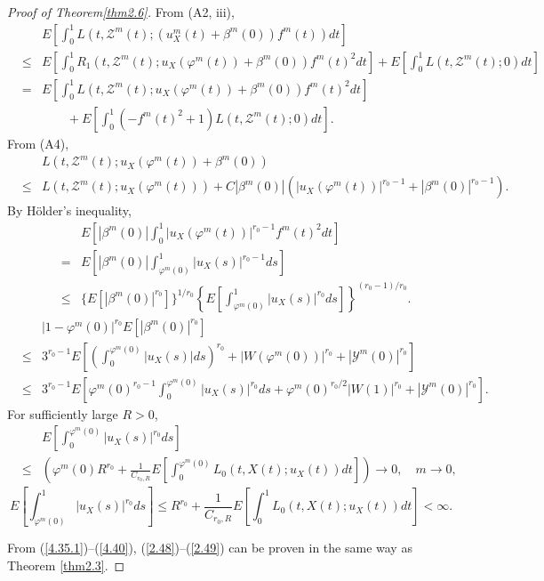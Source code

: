 \documentclass[12pt]{article}
\begin{document}
\begin{proof}[Proof of Theorem\ref{thm2.6}]
From (A2, iii),
\begin{eqnarray}\label{4.35.1}
&&E\left[\int_0^1L\left(t, \mathcal{Z}^m(t);\left(u_{X}^m(t)+\beta^m(0)\right)f^m(t)\right)dt\right]\\
& \le& 
E\left[\int_0^1R_1\left(t, \mathcal{Z}^m(t); u_X(\varphi^m(t))+\beta^m(0)\right)f^m(t)^2dt\right]
+E\left[\int_0^1L(t, \mathcal{Z}^m(t); 0)dt\right]\nonumber\\
&=&
E\left[\int_{0}^1L\left(t, \mathcal{Z}^m(t); u_X(\varphi^m(t))+\beta^m(0)\right)f^m(t)^2dt\right]\nonumber\\
&&\qquad +E\left[\int_0^1(-f^m(t)^2+1)L(t, \mathcal{Z}^m(t); 0)dt\right].\nonumber
\end{eqnarray}
From (A4),
\begin{eqnarray}
&&L\left(t, \mathcal{Z}^m(t); u_X(\varphi^m(t))+\beta^m(0)\right)\\
&\le&L\left(t, \mathcal{Z}^m(t); u_X(\varphi^m(t))\right)
+C|\beta^m(0)|\left(|u_X(\varphi^m(t))|^{r_0-1}
+\left|\beta^m(0)\right|^{r_0-1}\right).\nonumber
\end{eqnarray}
By H\"older's inequality,
\begin{eqnarray}%
&&E\left[|\beta^m(0)| \int_0^1|u_X(\varphi^m(t))|^{r_0-1}f^m(t)^2dt\right]\\
&=&E\left[|\beta^m(0)| \int_{\varphi^m(0)}^1|u_X(s)|^{r_0-1}ds\right]\nonumber\\
&\le&\{E [|\beta^m(0)|^{r_0}]\}^{1/r_0}
\left \{E\left[\int_{\varphi^m(0)}^1|u_X(s)|^{r_0}ds\right]\right\}^{(r_0-1)/r_0}.\nonumber
\end{eqnarray}
\begin{eqnarray}%
&&
\left|1-\varphi ^m(0)\right|^{r_0}
E\left[\left|\beta^m(0)\right|^{r_0}\right]\\
&\le & 3^{r_0-1}
E\left[\left(\int_0^{\varphi^m(0)}|u_X(s)|ds\right)^{r_0}+|W(\varphi^m(0))|^{r_0}
+|\mathcal{Y}^m(0)|^{r_0}\right]\nonumber\\
&\le & 3^{r_0-1}
E\left[\varphi^m(0)^{r_0-1}\int_0^{\varphi^m(0)}|u_X(s)|^{r_0}ds
+\varphi^m(0)^{r_0/2}|W(1)|^{r_0}
+|\mathcal{Y}^m(0)|^{r_0}\right].\nonumber
\end{eqnarray}
For sufficiently large $R>0$,
\begin{eqnarray}
&&E\left[\int_0^{\varphi^m(0)}|u_X(s)|^{r_0}ds\right]\\
&\le & \left(\varphi^m(0)R^{r_0}+\frac{1}{C_{r_0,R}}E\left[\int_{0}^{\varphi^m(0)}L_0(t, X(t);u_X(t))dt\right]\right) \to0, \quad m\to 0,\nonumber
\end{eqnarray}
\begin{equation}\label{4.40}
E\left[\int_{\varphi^m(0)}^1|u_X(s)|^{r_0}ds\right]
\le  R^{r_0}+\frac{1}{C_{r_0, R}}E\left[\int_{0}^1L_0(t, X(t);u_X(t))dt\right]<\infty.
\end{equation}

From (\ref{4.35.1})--(\ref{4.40}),  (\ref{2.48})--(\ref{2.49}) can be proven in the same way as Theorem \ref{thm2.3}.
\end{proof}
\end{document}
